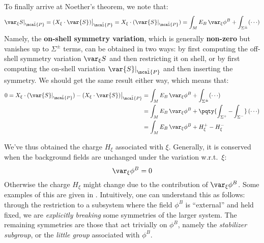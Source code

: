 \documentclass[a4paper
	,10pt
]{article}
\begin{document}
	To finally arrive at Noether's theorem, we note that:
	\begin{equation}
		\var_\xi S|_{\tilde{\mcal{P}}}
		= (X_\xi \cdot \var{S})\big|_{\tilde{\mcal{P}}}
		= X_\xi \cdot (\var{S}|_{\tilde{\mcal{P}}})
		= \int_M E_B \,\var_\xi{\phi^B}
			+ \int_{\Sigma^\pm} ({\cdots})
	\end{equation}
	Namely, the \textbf{on-shell symmetry variation}, which is generally \textbf{non-zero} but vanishes up to $\Sigma^\pm$ terms, can be obtained in two ways: by first computing the off-shell symmetry variation $\var_\xi S$ and then restricting it on shell, or by first computing the on-shell variation $\var{S}|_{\tilde{\mcal{P}}}$ and then inserting the symmetry. We should get the same result either way, which means that:
	\begin{equation}
	\begin{aligned}
		0
		= X_\xi \cdot (\var{S}|_{\tilde{\mcal{P}}})
		- (X_\xi \cdot \var{S})\big|_{\tilde{\mcal{P}}}
		&= \int_M E_B \,\var_\xi{\phi^B}
			+ \int_{\Sigma^\pm} ({\cdots}) \\
		&= \int_M E_B \,\var_\xi{\phi^B}
			+ \pqty{
				\int_{\Sigma^+} - \int_{\Sigma^-}
			}\, ({\cdots}) \\
		&= \int_M E_B \,\var_\xi{\phi^B}
			+ H_\xi^+ - H_\xi^-
	\end{aligned}
	\label{eq:charge_conserve_schematic}
	\end{equation}
	
	We've thus obtained the charge $H_\xi$ associated with $\xi$. Generally, it is conserved when the background fields are unchanged under the variation w.r.t.~$\xi$:
	\begin{equation}
		\var_\xi {\phi^B} = 0
	\end{equation}
	Otherwise the charge $H_\xi$ might change due to the contribution of $\var_\xi {\phi^B}$. Some examples of this are given in \cite{Banados:2016zim}. Intuitively, one can understand this as follows: through the restriction to a subsystem where the field $\phi^B$ is ``external'' and held fixed, we are \textit{explicitly breaking} some symmetries of the larger system. The remaining symmetries are those that act trivially on $\phi^B$, namely the \textit{stabilizer subgroup}, or the \textit{little group} associated with $\phi^B$. 
	
\end{document}
